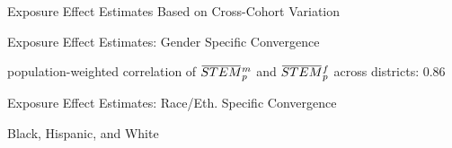 \documentclass[aspectratio=169,xcolor=dvipsnames]{beamer}
\newcommand{\overbar}[1]{\mkern 1.5mu\overline{\mkern-1.5mu#1\mkern-1.5mu}\mkern 1.5mu}
\begin{document}
\begin{frame}{Exposure Effect Estimates Based on Cross-Cohort Variation}\label{}
    \begin{table}[!htbp]
	\centering \footnotesize
	\captionsetup{width=1.0\textwidth}
\end{table}
\end{frame}

\begin{frame}{Exposure Effect Estimates: Gender Specific Convergence}\label{}
    \begin{table}[!htbp]
	\centering \footnotesize
	\captionsetup{width=1.0\textwidth}
\end{table}
population-weighted correlation of $\overbar{STEM}_p^m$ and $\overbar{STEM}_p^f$ across districts: 0.86
\end{frame}

\begin{frame}{Exposure Effect Estimates: Race/Eth. Specific Convergence}\label{}
    \begin{table}[!htbp]
	\centering \footnotesize
	\captionsetup{width=1.0\textwidth}
\end{table}
Black, Hispanic, and White
\end{frame}
\end{document}
